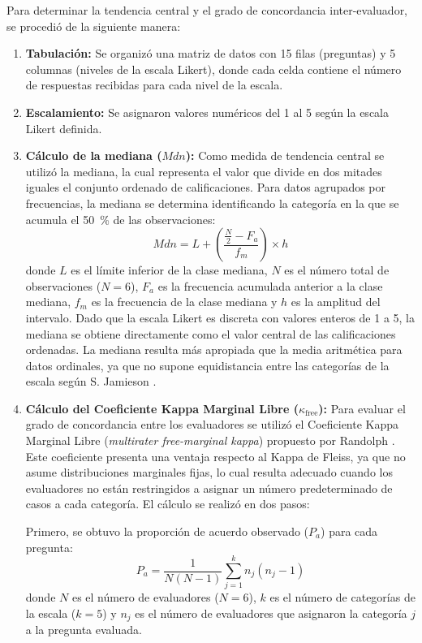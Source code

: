 Para determinar la tendencia central y el grado de concordancia inter-evaluador, se procedió de la siguiente manera:
\begin{enumerate}
    \item \textbf{Tabulación:} Se organizó una matriz de datos con 15 filas (preguntas) y 5 columnas (niveles de la escala Likert), donde cada celda contiene el número de respuestas recibidas para cada nivel de la escala.
    \item \textbf{Escalamiento:} Se asignaron valores numéricos del 1 al 5 según la escala Likert definida.
    \item \textbf{Cálculo de la mediana ($Mdn$):} Como medida de tendencia central se utilizó la mediana, la cual representa el valor que divide en dos mitades iguales el conjunto ordenado de calificaciones. Para datos agrupados por frecuencias, la mediana se determina identificando la categoría en la que se acumula el 50~\% de las observaciones:
          \begin{equation}
              Mdn = L + \left(\frac{\frac{N}{2} - F_{a}}{f_{m}}\right) \times h
              \label{eq:mediana}
          \end{equation}
          donde $L$ es el límite inferior de la clase mediana, $N$ es el número total de observaciones ($N = 6$), $F_{a}$ es la frecuencia acumulada anterior a la clase mediana, $f_{m}$ es la frecuencia de la clase mediana y $h$ es la amplitud del intervalo. Dado que la escala Likert es discreta con valores enteros de 1 a 5, la mediana se obtiene directamente como el valor central de las calificaciones ordenadas. La mediana resulta más apropiada que la media aritmética para datos ordinales, ya que no supone equidistancia entre las categorías de la escala según S. Jamieson \cite{jamieson2004}.
    \item \textbf{Cálculo del Coeficiente Kappa Marginal Libre ($\kappa_{\text{free}}$):} Para evaluar el grado de concordancia entre los evaluadores se utilizó el Coeficiente Kappa Marginal Libre (\textit{multirater free-marginal kappa}) propuesto por Randolph \cite{randolph2005}. Este coeficiente presenta una ventaja respecto al Kappa de Fleiss, ya que no asume distribuciones marginales fijas, lo cual resulta adecuado cuando los evaluadores no están restringidos a asignar un número predeterminado de casos a cada categoría. El cálculo se realizó en dos pasos:

          Primero, se obtuvo la proporción de acuerdo observado ($P_a$) para cada pregunta:
          \begin{equation}
              P_a = \frac{1}{N(N-1)} \sum_{j=1}^{k} n_j (n_j - 1)
              \label{eq:pa_kappa}
          \end{equation}
          donde $N$ es el número de evaluadores ($N = 6$), $k$ es el número de categorías de la escala ($k = 5$) y $n_j$ es el número de evaluadores que asignaron la categoría $j$ a la pregunta evaluada.


\end{enumerate}
